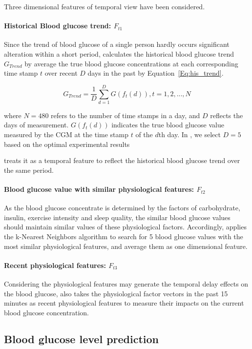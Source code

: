 Three dimensional features of temporal view have been considered.

\paragraph{Historical Blood glucose trend: $F_{t1}$} 
Since the trend of blood glucose of a single person hardly occurs significant alteration 
within a short period, \sysname calculates the historical blood glucose trend $G_{Trend}$ by average the true blood glucose
concentrations at each corresponding time stamp $t$ over recent $D$ days in the past by Equation~\ref{Eq:his_trend}. 

\begin{equation}\label{Eq:his_trend}
  G_{Trend}=\frac{1}{D}\sum_{d=1}^{D}G(f_t(d)),  t=1,2,...,N
\end{equation}

where $N=480$ refers to the number of time stamps in a day, and $D$ reflects the days of measurement. $G(f_t(d))$ indicates the true blood glucose value measured by the CGM
at the time stamp $t$ of the $d$th day. In \sysname, we select $D=5$ based on the optimal experimental results

\sysname treats it as a temporal feature to reflect the historical blood glucose trend
over the same period.

\paragraph{Blood glucose value with similar physiological features: $F_{t2}$}
As the blood glucose concentrate is determined by the factors of carbohydrate, insulin, exercise intensity and sleep quality, the similar blood 
glucose values should maintain similar values of these physiological factors. Accordingly, \sysname applies the k-Nearest Neighbors algorithm \cite{bib:KNN} 
to search for 5 blood glucose values with the most similar physiological features, and average them as one dimensional feature.

\paragraph{Recent physiological features: $F_{t3}$}
Considering the physiological features may generate the temporal delay effects on the blood glucose, \sysname also takes the physiological factor vectors
in the past 15 minutes as recent physiological features to measure their impacts on the current blood glucose concentration.    


\subsection{Blood glucose level prediction}


